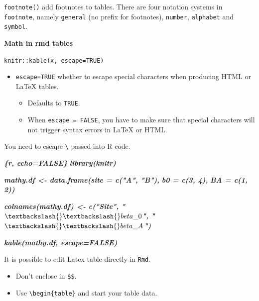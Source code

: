 \documentclass[
  a4paper,
  twoside,
  openright]{book}
\newenvironment{Shaded}{\begin{snugshade}}{\end{snugshade}}
\newcommand{\InformationTok}[1]{\textcolor[rgb]{0.56,0.35,0.01}{\textbf{\textit{#1}}}}
\providecommand{\tightlist}{%
  \setlength{\itemsep}{0pt}\setlength{\parskip}{0pt}}
\theoremstyle{definition}
\theoremstyle{definition}
\theoremstyle{definition}
\theoremstyle{definition}
\theoremstyle{remark}
\begin{document}
\texttt{footnote()} add footnotes to tables. There are four notation systems in \texttt{footnote}, namely \texttt{general} (no prefix for footnotes), \texttt{number}, \texttt{alphabet} and \texttt{symbol}.

\textbf{Math in rmd tables}

\texttt{knitr::kable(x,\ escape=TRUE)}

\begin{itemize}
\tightlist
\item
  \texttt{escape=TRUE} whether to escape special characters when producing HTML or LaTeX tables.

  \begin{itemize}
  \tightlist
  \item
    Defaults to \texttt{TRUE}.
  \item
    When \texttt{escape\ =\ FALSE}, you have to make sure that special characters will not trigger syntax errors in LaTeX or HTML.
  \end{itemize}
\end{itemize}

You need to escape \texttt{\textbackslash{}} passed into R code.

\begin{Shaded}
\begin{Highlighting}[]
\InformationTok{\textasciigrave{}\textasciigrave{}\textasciigrave{}\{r, echo=FALSE\}}
\InformationTok{library(knitr)}

\InformationTok{mathy.df \textless{}{-} data.frame(site = c("A", "B"), }
\InformationTok{                       b0 = c(3, 4), }
\InformationTok{                       BA = c(1, 2))}

\InformationTok{colnames(mathy.df) \textless{}{-} c("Site", "$\textbackslash{}\textbackslash{}beta\_0$", "$\textbackslash{}\textbackslash{}beta\_A$")}

\InformationTok{kable(mathy.df, escape=FALSE)}
\InformationTok{\textasciigrave{}\textasciigrave{}\textasciigrave{}}
\end{Highlighting}
\end{Shaded}

It is possible to edit Latex table directly in \texttt{Rmd}.

\begin{itemize}
\tightlist
\item
  Don't enclose in \texttt{\$\$}.
\item
  Use \texttt{\textbackslash{}begin\{table\}} and start your table data.
\end{itemize}
\end{document}
